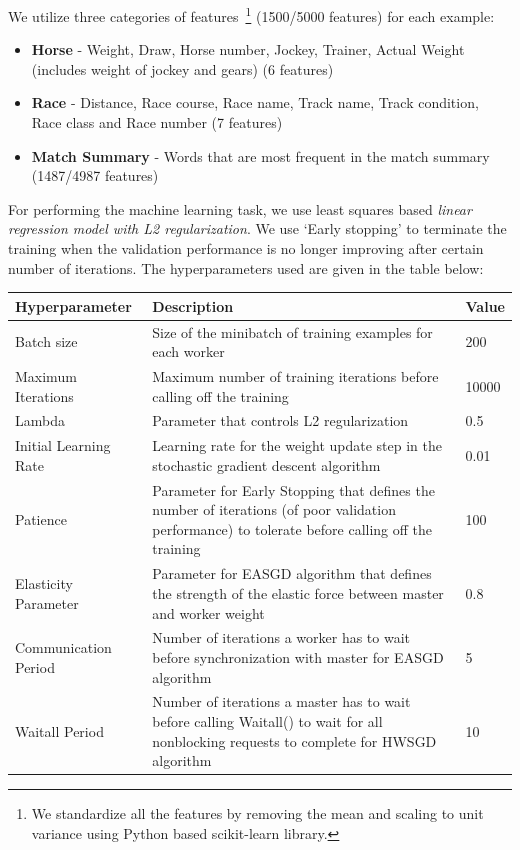 \documentclass[12pt]{article}
\begin{document}
We utilize three categories of features~\footnote{We standardize all the features by removing the mean and scaling to unit variance using Python based scikit-learn library.} (1500/5000 features) for each example:
\begin{itemize}
  \item \textbf{Horse} - Weight, Draw, Horse number, Jockey, Trainer, Actual Weight (includes weight of jockey and gears) (6 features)
  \item \textbf{Race} - Distance, Race course, Race name, Track name, Track condition, Race class and Race number (7 features)
  \item \textbf{Match Summary} - Words that are most frequent in the match summary (1487/4987 features)
\end{itemize}

For performing the machine learning task, we use least squares based \textit{linear regression model with L2 regularization}. We use `Early stopping' to terminate the training when the validation performance is no longer improving after certain number of iterations. The hyperparameters used are given in the table below:
\begin{table}[ht]
\centering
 \begin{tabular}{lp{4.0in}l} 
 \toprule
\textbf{Hyperparameter} & \textbf{Description} & \textbf{Value} \\ \midrule
Batch size & Size of the minibatch of training examples for each worker & 200 \\
Maximum Iterations & Maximum number of training iterations before calling off the training & 10000 \\
Lambda & Parameter that controls L2 regularization & 0.5\\
Initial Learning Rate & Learning rate for the weight update step in the stochastic gradient descent algorithm & 0.01 \\
Patience & Parameter for Early Stopping that defines the number of iterations (of poor validation performance) to tolerate before calling off the training & 100 \\
Elasticity Parameter & Parameter for EASGD algorithm that defines the strength of the elastic force between master and worker weight & 0.8 \\
Communication Period & Number of iterations a worker has to wait before synchronization with master for EASGD algorithm & 5 \\
Waitall Period & Number of iterations a master has to wait before calling Waitall() to wait for all nonblocking requests to complete for HWSGD algorithm & 10 \\
\bottomrule
\end{tabular}
\end{table}
\end{document}
